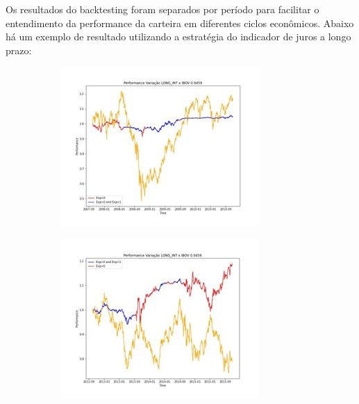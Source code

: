 Os resultados do backtesting foram separados por período para facilitar o entendimento da performance da carteira em diferentes ciclos econômicos. Abaixo há um exemplo de resultado utilizando a estratégia do indicador de juros a longo prazo:

\begin{figure}[H]
    \centering
    \begin{subfigure}{0.45\linewidth}
        \includegraphics[width = \textwidth]{relatorios/consult/imagens/Imagem3.jpg}
    \end{subfigure}
    \hfill
    \begin{subfigure}{0.45\linewidth}
        \includegraphics[width = \textwidth]{relatorios/consult/imagens/Imagem4.jpg}

\end{subfigure}
\end{figure}
